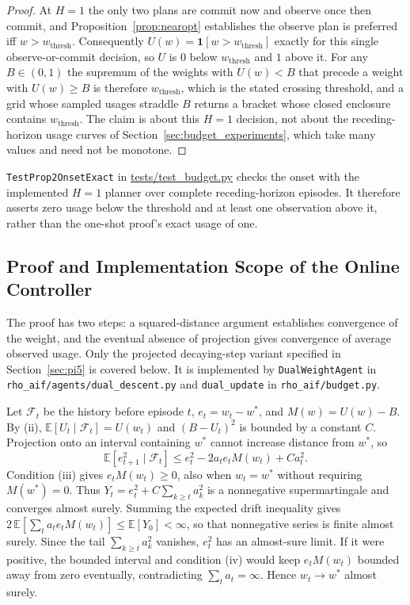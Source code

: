 \documentclass[runningheads]{llncs}
\begin{document}
\begin{proof}
At $H{=}1$ the only two plans are commit now and observe once then commit, and Proposition~\ref{prop:nearopt} establishes the observe plan is preferred iff $w > w_{\mathrm{thresh}}$. Consequently $U(w) = \mathbf{1}[w > w_{\mathrm{thresh}}]$ exactly for this single observe-or-commit decision, so $U$ is $0$ below $w_{\mathrm{thresh}}$ and $1$ above it. For any $B \in (0,1)$ the supremum of the weights with $U(w) < B$ that precede a weight with $U(w) \ge B$ is therefore $w_{\mathrm{thresh}}$, which is the stated crossing threshold, and a grid whose sampled usages straddle $B$ returns a bracket whose closed enclosure contains $w_{\mathrm{thresh}}$. The claim is about this $H{=}1$ decision, not about the receding-horizon usage curves of Section~\ref{sec:budget_experiments}, which take many values and need not be monotone.
\end{proof}

\texttt{TestProp2OnsetExact} in \url{tests/test_budget.py} checks the onset with the implemented $H=1$ planner over complete receding-horizon episodes. It therefore asserts zero usage below the threshold and at least one observation above it, rather than the one-shot proof's exact usage of one.

\subsection{Proof and Implementation Scope of the Online Controller}
\label{app:theory_controller}



The proof has two steps: a squared-distance argument establishes convergence of the weight, and the eventual absence of projection gives convergence of average observed usage. Only the projected decaying-step variant specified in Section~\ref{sec:pi5} is covered below. It is implemented by \texttt{DualWeightAgent} in \texttt{rho\_\allowbreak aif/\allowbreak agents/\allowbreak dual\_\allowbreak descent.py} and \texttt{dual\_\allowbreak update} in \texttt{rho\_\allowbreak aif/\allowbreak budget.py}.

Let $\mathcal{F}_t$ be the history before episode $t$, $e_t=w_t-w^*$, and $M(w)=U(w)-B$. By (ii), $\mathbb{E}[U_t\mid\mathcal{F}_t]=U(w_t)$ and $(B-U_t)^2$ is bounded by a constant $C$. Projection onto an interval containing $w^*$ cannot increase distance from $w^*$, so
\[
\mathbb{E}[e_{t+1}^2\mid\mathcal{F}_t]
\le e_t^2-2a_t e_t M(w_t)+C a_t^2.
\]
Condition (iii) gives $e_t M(w_t)\ge0$, also when $w_t=w^*$ without requiring $M(w^*)=0$. Thus $Y_t=e_t^2+C\sum_{k\ge t}a_k^2$ is a nonnegative supermartingale and converges almost surely. Summing the expected drift inequality gives $2\,\mathbb{E}[\sum_t a_t e_t M(w_t)]\le\mathbb{E}[Y_0]<\infty$, so that nonnegative series is finite almost surely. Since the tail $\sum_{k\ge t}a_k^2$ vanishes, $e_t^2$ has an almost-sure limit. If it were positive, the bounded interval and condition (iv) would keep $e_t M(w_t)$ bounded away from zero eventually, contradicting $\sum_t a_t=\infty$. Hence $w_t\to w^*$ almost surely.
\end{document}
